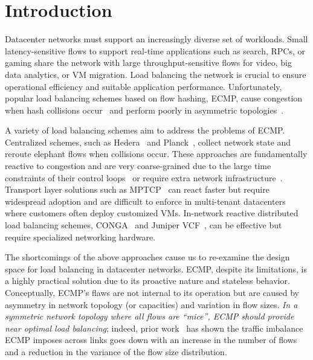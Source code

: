 \section{Introduction}
\label{section:intro}

Datacenter networks must support an increasingly diverse set of
workloads.
Small latency-sensitive flows to support real-time applications such
as search, RPCs, or gaming share the network with large
throughput-sensitive flows for video, big data analytics, or VM
migration.
Load balancing the network is crucial to ensure operational efficiency
and suitable application performance.
Unfortunately, popular load balancing schemes based on flow hashing,
\eg{}ECMP, cause congestion when hash collisions
occur~\cite{hedera,dc-mptcp,planck,vmware,detail,packetspray,drb} and
perform poorly in asymmetric topologies~\cite{conga,wcmp}.

A variety of load balancing schemes aim to address the
problems of ECMP.
Centralized schemes, such as Hedera~\cite{hedera} and
Planck~\cite{planck}, collect network state and reroute elephant flows
when collisions occur.
These approaches are fundamentally reactive to congestion and are
very coarse-grained due to the large time constraints of their control
loops~\cite{hedera} or require extra network
infrastructure~\cite{planck}.
Transport layer solutions such as MPTCP~\cite{mptcp} can
react faster but require widespread adoption and are difficult to
enforce in multi-tenant datacenters where customers often deploy
customized VMs.
In-network reactive distributed load balancing schemes, \eg{}CONGA~\cite{conga} and Juniper VCF~\cite{juniper-vcf}, can be
effective but require specialized networking hardware.


The shortcomings of the above approaches cause us to re-examine the design space for load balancing in datacenter networks. ECMP, despite its limitations, is a highly practical solution due to its proactive nature and stateless behavior.
Conceptually, ECMP's flaws are not internal to its operation but are caused by asymmetry in network topology (or capacities) and variation in flow sizes. {\em In a symmetric network topology
where all flows are ``mice'', ECMP should provide near optimal load balancing}; indeed, prior work~\cite{conga,flowlet} has shown the traffic imbalance ECMP imposes across links goes down with an increase in the number of flows and a reduction in the variance of the flow size distribution. 

